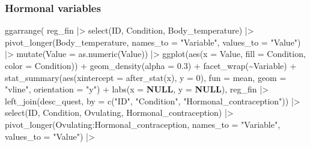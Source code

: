 \documentclass[
  bookmarksnumbered]{article}
\newenvironment{Shaded}{\begin{snugshade}}{\end{snugshade}}
\newcommand{\AttributeTok}[1]{\textcolor[rgb]{0.80,0.80,0.80}{#1}}
\newcommand{\ConstantTok}[1]{\textcolor[rgb]{0.86,0.64,0.64}{\textbf{#1}}}
\newcommand{\DecValTok}[1]{\textcolor[rgb]{0.86,0.86,0.80}{#1}}
\newcommand{\FloatTok}[1]{\textcolor[rgb]{0.75,0.75,0.82}{#1}}
\newcommand{\FunctionTok}[1]{\textcolor[rgb]{0.94,0.94,0.56}{#1}}
\newcommand{\NormalTok}[1]{\textcolor[rgb]{0.80,0.80,0.80}{#1}}
\newcommand{\SpecialCharTok}[1]{\textcolor[rgb]{0.86,0.64,0.64}{#1}}
\newcommand{\StringTok}[1]{\textcolor[rgb]{0.80,0.58,0.58}{#1}}
\begin{document}
\subsubsection{Hormonal variables}\label{hormonal-variables}

\begin{Shaded}
\begin{Highlighting}[]
\FunctionTok{ggarrange}\NormalTok{(}
\NormalTok{  reg\_fin }\SpecialCharTok{|\textgreater{}}
    \FunctionTok{select}\NormalTok{(ID, Condition, Body\_temperature) }\SpecialCharTok{|\textgreater{}}
    \FunctionTok{pivot\_longer}\NormalTok{(Body\_temperature,}
      \AttributeTok{names\_to =} \StringTok{"Variable"}\NormalTok{,}
      \AttributeTok{values\_to =} \StringTok{"Value"}\NormalTok{) }\SpecialCharTok{|\textgreater{}}
    \FunctionTok{mutate}\NormalTok{(}\AttributeTok{Value =} \FunctionTok{as.numeric}\NormalTok{(Value)) }\SpecialCharTok{|\textgreater{}}
    \FunctionTok{ggplot}\NormalTok{(}\FunctionTok{aes}\NormalTok{(}\AttributeTok{x =}\NormalTok{ Value, }\AttributeTok{fill =}\NormalTok{ Condition, }\AttributeTok{color =}\NormalTok{ Condition)) }\SpecialCharTok{+}
    \FunctionTok{geom\_density}\NormalTok{(}\AttributeTok{alpha =} \FloatTok{0.3}\NormalTok{) }\SpecialCharTok{+}
    \FunctionTok{facet\_wrap}\NormalTok{(}\SpecialCharTok{\textasciitilde{}}\NormalTok{Variable) }\SpecialCharTok{+}
    \FunctionTok{stat\_summary}\NormalTok{(}\FunctionTok{aes}\NormalTok{(}\AttributeTok{xintercept =} \FunctionTok{after\_stat}\NormalTok{(x), }\AttributeTok{y =} \DecValTok{0}\NormalTok{),}
      \AttributeTok{fun =}\NormalTok{ mean, }\AttributeTok{geom =} \StringTok{"vline"}\NormalTok{, }\AttributeTok{orientation =} \StringTok{"y"}\NormalTok{) }\SpecialCharTok{+}
    \FunctionTok{labs}\NormalTok{(}\AttributeTok{x =} \ConstantTok{NULL}\NormalTok{, }\AttributeTok{y =} \ConstantTok{NULL}\NormalTok{),}
\NormalTok{  reg\_fin }\SpecialCharTok{|\textgreater{}}
    \FunctionTok{left\_join}\NormalTok{(desc\_quest, }\AttributeTok{by =} \FunctionTok{c}\NormalTok{(}\StringTok{"ID"}\NormalTok{, }\StringTok{"Condition"}\NormalTok{, }\StringTok{"Hormonal\_contraception"}\NormalTok{)) }\SpecialCharTok{|\textgreater{}}
    \FunctionTok{select}\NormalTok{(ID, Condition, Ovulating, Hormonal\_contraception) }\SpecialCharTok{|\textgreater{}}
    \FunctionTok{pivot\_longer}\NormalTok{(Ovulating}\SpecialCharTok{:}\NormalTok{Hormonal\_contraception,}
      \AttributeTok{names\_to =} \StringTok{"Variable"}\NormalTok{,}
      \AttributeTok{values\_to =} \StringTok{"Value"}\NormalTok{) }\SpecialCharTok{|\textgreater{}}

\end{Highlighting}
\end{Shaded}
\end{document}
